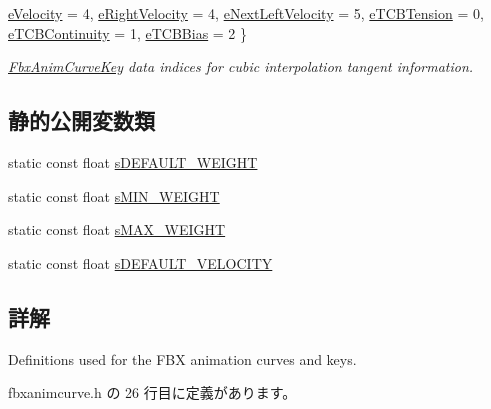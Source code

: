 \begin{DoxyCompactItemize}
\hyperlink{class_fbx_anim_curve_def_a3be261d961f8226235529b148cf80300a8732f3303563dd6d7e92373e6e930648}{e\+Velocity} = 4, 
\hyperlink{class_fbx_anim_curve_def_a3be261d961f8226235529b148cf80300a4009b9f2bd63546ecd6ce63e5a60701f}{e\+Right\+Velocity} = 4, 
\hyperlink{class_fbx_anim_curve_def_a3be261d961f8226235529b148cf80300af617635230401e91d520361c9b02db41}{e\+Next\+Left\+Velocity} = 5, 
\newline
\hyperlink{class_fbx_anim_curve_def_a3be261d961f8226235529b148cf80300a38129a423990a42f94187b77ab041caa}{e\+T\+C\+B\+Tension} = 0, 
\hyperlink{class_fbx_anim_curve_def_a3be261d961f8226235529b148cf80300a5544ce65720f37d5a2620dc32556b2ba}{e\+T\+C\+B\+Continuity} = 1, 
\hyperlink{class_fbx_anim_curve_def_a3be261d961f8226235529b148cf80300a4ed5dbb6b725478205a3c750c20790d3}{e\+T\+C\+B\+Bias} = 2
 \}\begin{DoxyCompactList}\small\item\em \hyperlink{class_fbx_anim_curve_key}{Fbx\+Anim\+Curve\+Key} data indices for cubic interpolation tangent information. \end{DoxyCompactList}
\end{DoxyCompactItemize}
\subsection*{静的公開変数類}
\begin{DoxyCompactItemize}
\item 
static const float \hyperlink{class_fbx_anim_curve_def_a6fd6b3907962eba0b1e71f28b55fad9d}{s\+D\+E\+F\+A\+U\+L\+T\+\_\+\+W\+E\+I\+G\+HT}
\item 
static const float \hyperlink{class_fbx_anim_curve_def_a469319cefa59b62fd38985b837e49d07}{s\+M\+I\+N\+\_\+\+W\+E\+I\+G\+HT}
\item 
static const float \hyperlink{class_fbx_anim_curve_def_ad0e9ffa9198f867a8eec3b78d7363438}{s\+M\+A\+X\+\_\+\+W\+E\+I\+G\+HT}
\item 
static const float \hyperlink{class_fbx_anim_curve_def_abebd0a6078f18802836059fdefb36862}{s\+D\+E\+F\+A\+U\+L\+T\+\_\+\+V\+E\+L\+O\+C\+I\+TY}
\end{DoxyCompactItemize}


\subsection{詳解}
Definitions used for the F\+BX animation curves and keys. 

 fbxanimcurve.\+h の 26 行目に定義があります。



